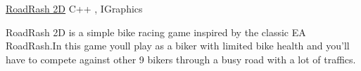 \documentclass[]{awesome-cv}
\begin{document}
\begin{cventries}
	\vspace{-5mm}
	\cventry
	{}
	{\href{https://github.com/minhaz725/RoadRash2D}{\underline{RoadRash 2D}}}
	{C++ , IGraphics}
	{}
	{\begin{cvitems}
			\item {RoadRash 2D is a simple bike racing game inspired by the classic EA RoadRash.In this game you\textquotesingle{}ll play as a biker with limited bike health and you'll have to compete against other 9 bikers through a busy road with a lot of traffics.}
	\end{cvitems}}
	
	
\end{cventries}

\ 
\end{document}
